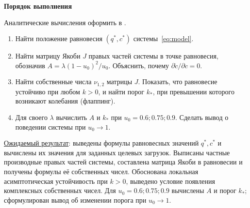 \documentclass[12pt,a4paper]{article}
\newcommand{\taskhead}[1]{\par\textbf{#1}\par}
\begin{document}
\taskhead{Порядок выполнения}
Аналитические вычисления оформить в .
\begin{enumerate}
\item Найти положение равновесия $(q^*,c^*)$ системы~\eqref{eq:model}.
\item Найти матрицу Якоби $J$ правых частей системы в точке равновесия,
обозначив $A=\lambda(1-u_0)^2/u_0$. Объяснить, почему $\partial\dot c/\partial c=0$.
\item Найти собственные числа $\nu_{1,2}$ матрицы $J$. Показать, что равновесие
устойчиво при любом $k>0$, и найти порог $k_*$, при превышении которого
возникают колебания (флаппинг).
\item Для своего $\lambda$ вычислить $A$ и $k_*$ при $u_0=0.6;0.75;0.9$.
Сделать вывод о поведении системы при $u_0\to1$.
\end{enumerate}
\underline{Ожидаемый результат}: выведены формулы равновесных значений
$q^*,c^*$ и вычислены их значения для заданных целевых загрузок.
Выписаны частные производные правых частей системы, составлена матрица
Якоби в равновесии и получены формулы её собственных чисел.
Обоснована локальная асимптотическая устойчивость при $k>0$,
выведено условие появления комплексных собственных чисел.
Для $u_0=0.6;0.75;0.9$ вычислены $A$ и порог $k_*$;
сформулирован вывод об изменении порога при $u_0\to1$.
\end{document}
